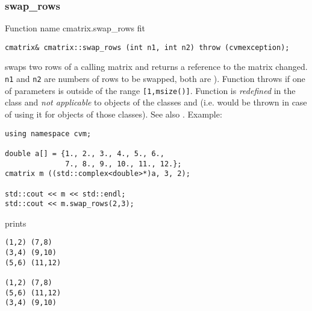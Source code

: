 \subsubsection{swap\_rows}
Function%
\pdfdest name {cmatrix.swap_rows} fit
\begin{verbatim}
cmatrix& cmatrix::swap_rows (int n1, int n2) throw (cvmexception);
\end{verbatim}
swaps two rows of a calling matrix and returns a reference to
the matrix changed. \verb"n1" and \verb"n2" are
numbers of rows to be swapped, 
both are \Based).
Function throws  
if one of  parameters is outside of the range
\verb"[1,msize()]".
Function is \emph{redefined} in the class
 and
\emph{not applicable} to objects of the classes
 and
 (i.e. 
 would be thrown
in case of using it for objects of those classes).
See also .
Example:
\begin{Verbatim}
using namespace cvm;

double a[] = {1., 2., 3., 4., 5., 6.,
              7., 8., 9., 10., 11., 12.};
cmatrix m ((std::complex<double>*)a, 3, 2);

std::cout << m << std::endl;
std::cout << m.swap_rows(2,3);
\end{Verbatim}
prints
\begin{Verbatim}
(1,2) (7,8)
(3,4) (9,10)
(5,6) (11,12)

(1,2) (7,8)
(5,6) (11,12)
(3,4) (9,10)
\end{Verbatim}
\newpage




